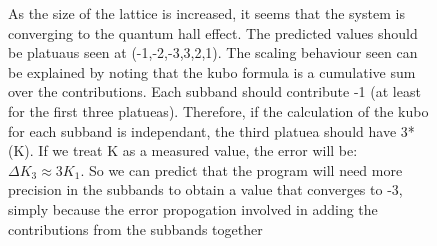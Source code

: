 \documentclass[12pt]{article}
\begin{document}
\begin{figure}[H]%
 	\centering
		\caption{As the size of the lattice is increased, it seems that the system is converging to the quantum hall effect. The predicted values should be platuaus seen at (-1,-2,-3,3,2,1). The scaling behaviour
		seen can be explained by noting that the kubo formula is a
		cumulative sum over the contributions. Each subband should
		contribute -1 (at least for the first three platueas). Therefore, if the calculation of the kubo for each subband is independant, the third platuea should have 3*(K). If we treat K as a measured value, the error will be: $\Delta K_3 \approx 3 K_1$. So we can predict that
		the program will need more precision in the subbands to
		obtain a value that converges to -3, simply because the
		error propogation involved in adding the contributions from
		the subbands together}
         \label{QScalingQHE}
\end{figure}
\end{document}
